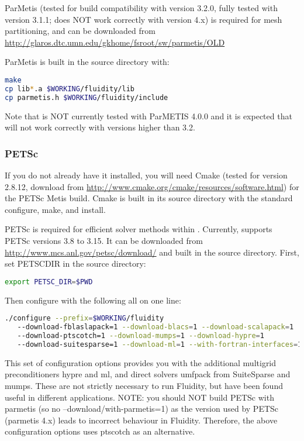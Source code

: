 ParMetis (tested for \fluidity build compatibility with version 3.2.0, fully
tested with version 3.1.1; \fluidity does NOT work correctly with version 4.x) is required for mesh
partitioning, and can be downloaded from
\url{http://glaros.dtc.umn.edu/gkhome/fsroot/sw/parmetis/OLD}

ParMetis is built in the source directory with:

\begin{lstlisting}[language=bash]
make
cp lib*.a $WORKING/fluidity/lib
cp parmetis.h $WORKING/fluidity/include
\end{lstlisting}

Note that \fluidity is NOT currently tested with ParMETIS 4.0.0 and it is
expected that \fluidity will not work correctly with versions higher than 3.2.

\subsubsection{PETSc}
\label{sec:required_libraries_numerical_petsc}

If you do not already have it installed, you will need Cmake (tested for
version 2.8.12, download from
\url{http://www.cmake.org/cmake/resources/software.html}) for the PETSc Metis
build.  Cmake is built in its source directory with the standard configure,
make, and install.

PETSc is required for
efficient solver methods within \fluidity. Currently,
\fluidity supports PETSc versions 3.8 to 3.15. It can be downloaded from
\url{http://www.mcs.anl.gov/petsc/download/} and built in the source directory.
First, set PETSC{\textunderscore}DIR in the source directory:

\begin{lstlisting}[language=bash]
export PETSC_DIR=$PWD
\end{lstlisting}

Then configure with the following all on one line:

\begin{lstlisting}[language=bash]
./configure --prefix=$WORKING/fluidity 
   --download-fblaslapack=1 --download-blacs=1 --download-scalapack=1 
   --download-ptscotch=1 --download-mumps=1 --download-hypre=1
   --download-suitesparse=1 --download-ml=1 --with-fortran-interfaces=1
\end{lstlisting}

This set of configuration options provides you with the additional
multigrid preconditioners hypre and ml, and direct solvers umfpack 
from SuiteSparse and mumps. These are not strictly necessary to run
Fluidity, but have been found useful in different applications. NOTE:
you should NOT build PETSc with parmetis
(so no --download/with-parmetis=1) as the version used by PETSc 
(parmetis 4.x) leads to incorrect behaviour in Fluidity. Therefore, the above
configuration options uses ptscotch as an alternative.

